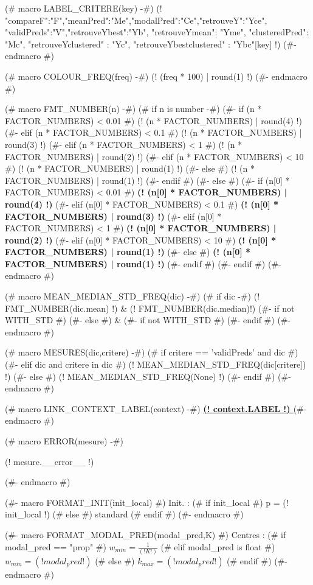(# macro LABEL_CRITERE(key) -#)
{\small (! {"compareF":"F","meanPred":"Me","modalPred":"Ce","retrouveY":"Yce",
"validPreds":"V","retrouveYbest":"Yb", "retrouveYmean": "Yme", "clusteredPred": "Mc",
"retrouveYclustered" : "Yc", "retrouveYbestclustered" : "Ybc"}[key] !)  }
(#- endmacro #)

(# macro COLOUR_FREQ(freq) -#)
\textcolor[rgb]{ (! (2 * (1.1 - freq))  | round(3) | truncate01 !) , (! (2 * freq - 1.3) | round(3) | truncate01 !) , 0.1}{(! (freq * 100) | round(1) !)}
(#- endmacro #)

(# macro FMT_NUMBER(n) -#)
(# if n is number -#)
(#- if (n  * FACTOR_NUMBERS) < 0.01 #)
(! (n  * FACTOR_NUMBERS) | round(4) !)
(#- elif (n  * FACTOR_NUMBERS) < 0.1 #)
(! (n  * FACTOR_NUMBERS) | round(3) !)
(#- elif (n  * FACTOR_NUMBERS) < 1 #)
(! (n  * FACTOR_NUMBERS) | round(2) !)
(#- elif (n  * FACTOR_NUMBERS) < 10 #)
(! (n  * FACTOR_NUMBERS) | round(1) !)
(#- else #)
(! (n  * FACTOR_NUMBERS) | round(1) !)
(#- endif #)
(#- else #)
(#- if (n[0] * FACTOR_NUMBERS) < 0.01 #)
\textbf{ (! (n[0] * FACTOR_NUMBERS) | round(4) !)}
(#- elif (n[0] * FACTOR_NUMBERS) < 0.1 #)
\textbf{ (! (n[0] * FACTOR_NUMBERS) | round(3) !)}
(#- elif (n[0] * FACTOR_NUMBERS) < 1 #)
\textbf{ (! (n[0] * FACTOR_NUMBERS) | round(2) !)}
(#- elif (n[0] * FACTOR_NUMBERS) < 10 #)
\textbf{ (! (n[0] * FACTOR_NUMBERS) | round(1) !)}
(#- else #)
\textbf{ (! (n[0] * FACTOR_NUMBERS) | round(1) !)}
(#- endif #)
(#- endif #)
(#- endmacro #)


(# macro MEAN_MEDIAN_STD_FREQ(dic) -#)
(# if dic -#)
(! FMT_NUMBER(dic.mean) !) & {\footnotesize (! FMT_NUMBER(dic.median)!) } (#- if not WITH_STD #) %
(#- else #)
& (#- if not WITH_STD #) %
(#- endif #)
(#- endmacro #)


(# macro MESURES(dic,critere) -#)
(# if critere == 'validPreds' and dic #)
(#- elif dic and critere in dic #)
    (!  MEAN_MEDIAN_STD_FREQ(dic[critere]) !)
(#- else #)
(! MEAN_MEDIAN_STD_FREQ(None) !)
(#- endif #)
(#- endmacro #)


(# macro LINK_CONTEXT_LABEL(context) -#)
\textbf{ \hyperref[contexts]{ (! context.LABEL !) }}
(#- endmacro #)

(# macro ERROR(mesure) -#)
\begin{minipage}{0.1\columnwidth}
    (! mesure.__error__ !)
\end{minipage}
(#- endmacro #)

(#- macro FORMAT_INIT(init_local) #)
Init. : (# if init_local #) p = (! init_local !) (# else #) standard (# endif #)
(#- endmacro #)

(#- macro FORMAT_MODAL_PRED(modal_pred,K) #)
Centres :
(# if modal_pred == "prop" #)
$w_{min} = \frac{1}{(! K !)}$
(# elif modal_pred is float #)
$w_{min} = (! modal_pred !)$
(# else #)
$k_{max} = (! modal_pred !)$
(# endif #)
(#- endmacro #)